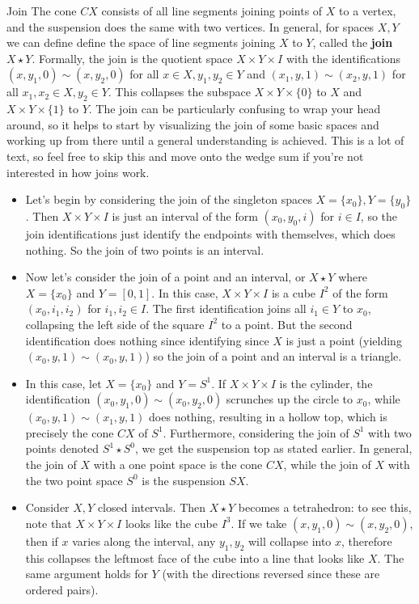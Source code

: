 \begin{namedthing}{Join}
    The cone $CX$ consists of all line segments joining points of $X$ to a vertex, and the suspension does the same with two vertices. In general, for spaces $X,Y$ we can define define the space of line segments joining $X$ to $Y$, called the \textbf{join} $X\star Y$. Formally, the join is the quotient space  $X\times Y\times I$ with the identifications $(x,y_1,0)\sim (x,y_2,0)$ for all $x\in X,y_1,y_2\in Y$ and $(x_1,y,1)\sim (x_2,y,1)$ for all $x_1,x_2\in X,y_2\in Y$. This collapses the subspace $X\times Y\times \{0\} $ to $X$ and $X\times Y\times \{1\} $ to $Y$. The join can be particularly confusing to wrap your head around, so it helps to start by visualizing the join of some basic spaces and working up from there until a general understanding is achieved. This is a lot of text, so feel free to skip this and move onto the wedge sum if you're not interested in how joins work.
    \begin{itemize}
        \item Let's begin by considering the join of the singleton spaces $X=\{x_0\} ,Y=\{y_0\} $. Then $X\times Y\times I$ is just an interval of the form $(x_0,y_0,i)$ for $i\in I$, so the join identifications just identify the endpoints with themselves, which does nothing. So the join of two points is an interval.
        \item Now let's consider the join of a point and an interval, or $X\star Y$ where $X=\{x_0\} $ and $Y=[0,1]$. In this case, $X\times Y\times I$ is a cube $I^2$ of the form $(x_0,i_1,i_2)$ for $i_1,i_2\in I$. The first identification joins all $i_1\in Y$ to $x_0$, collapsing the left side of the square $I^2$ to a point. But the second identification does nothing since identifying since $X$ is just a point (yielding $(x_0,y,1)\sim (x_0,y,1)$) so the join of a point and an interval is a triangle. 
        \item In this case, let $X=\{x_0\} $ and $Y=S^1 $. If $X\times Y\times I$ is the cylinder, the identification $(x_0,y_1,0)\sim(x_0,y_2,0)$ scrunches up the circle to $x_0$, while $(x_0,y,1)\sim(x_1,y,1)$ does nothing, resulting in a hollow top, which is precisely the cone $CX$ of $S^1 $. Furthermore, considering the join of $S^1 $ with two points denoted $S^1 \star S^0$, we get the suspension top as stated earlier. In general, the join of $X$ with a one point space is the cone $CX$, while the join of $X$ with the two point space $S^0$ is the suspension $SX$.
        \item Consider $X,Y$ closed intervals. Then $X\star Y$ becomes a tetrahedron: to see this, note that $X\times Y\times I$ looks like the cube $I^3$. If we take $(x,y_1,0)\sim(x,y_2,0)$, then if $x$ varies along the interval, any $y_1,y_2$ will collapse into $x$, therefore this collapses the leftmost face of the cube into a line that looks like $X$. The same argument holds for $Y$ (with the directions reversed since these are ordered pairs). 

\end{itemize}
\end{namedthing}
